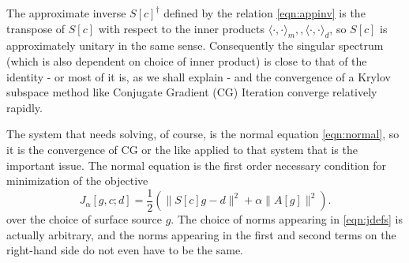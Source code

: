 The approximate inverse $S[c]^{\dagger}$ defined by the relation \ref{eqn:appinv} is the transpose of $S[c]$ with respect to the inner products $\langle \cdot,\cdot \rangle_m,, \langle \cdot,\cdot \rangle_d$, so $S[c]$ is approximately unitary in the same sense. Consequently the singular spectrum (which is also dependent on choice of inner product) is close to that of the identity - or most of it is, as we shall explain - and the convergence of  a Krylov subspace method like Conjugate Gradient (CG) Iteration converge relatively rapidly. 

The system that needs solving, of course, is the normal equation \ref{eqn:normal},  so it is the convergence of CG or the like applied to that system that is the important issue. The normal equation is the first order necessary condition for minimization of the objective
\begin{equation}
\label{eqn:jdefs}
J_{\alpha}[g,c;d] = \frac{1}{2}( \|S[c]g -d \|^2 + \alpha \|A[g]\|^2).
\end{equation}
over the choice of surface source $g$. The choice of norms appearing in \ref{eqn:jdefs} is actually arbitrary, and the norms appearing in the first and second terms on the right-hand side do not even have to be the same. 





